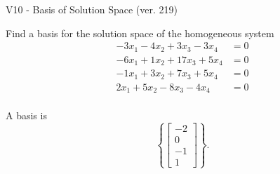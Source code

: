 \begin{exercise}
  \begin{exerciseTitle}V10 - Basis of Solution Space (ver. 219)\end{exerciseTitle}
  \begin{exerciseStatement}
    Find a basis for the solution space of the homogeneous system 
\begin{align*}
 -3 x_ 1 -4 x_ 2 + 3 x_ 3 -3 x_ 4 &= 0  \\ 
  -6 x_ 1 + 1 x_ 2 + 17 x_ 3 + 5 x_ 4 &= 0  \\ 
  -1 x_ 1 + 3 x_ 2 + 7 x_ 3 + 5 x_ 4 &= 0  \\ 
  2 x_ 1 + 5 x_ 2 -8 x_ 3 -4 x_ 4 &= 0  \\ 
 \end{align*}


 
  \end{exerciseStatement}

  \begin{exerciseAnswer}
   A basis is   
\[\left\{\left[\begin{array}{c}
-2 \\
0 \\
-1 \\
1
\end{array}\right]\right\}.\]

  


  \end{exerciseAnswer}
\end{exercise}